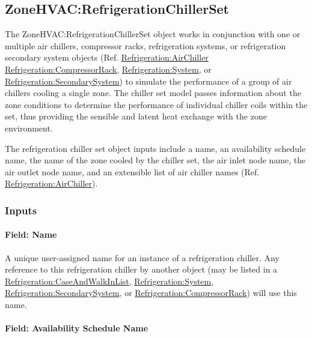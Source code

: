 \subsection{ZoneHVAC:RefrigerationChillerSet}\label{zonehvacrefrigerationchillerset}

The ZoneHVAC:RefrigerationChillerSet object works in conjunction with one or multiple air chillers, compressor racks, refrigeration systems, or refrigeration secondary system objects (Ref. \hyperref[refrigerationairchiller]{Refrigeration:AirChiller} \hyperref[refrigerationcompressorrack]{Refrigeration:CompressorRack}, \hyperref[refrigerationsystem]{Refrigeration:System}, or \hyperref[refrigerationsecondarysystem]{Refrigeration:SecondarySystem}) to simulate the performance of a group of air chillers cooling a single zone. The chiller set model passes information about the zone conditions to determine the performance of individual chiller coils within the set, thus providing the sensible and latent heat exchange with the zone environment.

The refrigeration chiller set object inputs include a name, an availability schedule name, the name of the zone cooled by the chiller set, the air inlet node name, the air outlet node name, and an extensible list of air chiller names (Ref. \hyperref[refrigerationairchiller]{Refrigeration:AirChiller}).

\subsubsection{Inputs}\label{inputs-10-024}

\paragraph{Field: Name}\label{field-name-10-020}

A unique user-assigned name for an instance of a refrigeration chiller. Any reference to this refrigeration chiller by another object (may be listed in a \hyperref[refrigerationcaseandwalkinlist]{Refrigeration:CaseAndWalkInList}, \hyperref[refrigerationsystem]{Refrigeration:System}, \hyperref[refrigerationsecondarysystem]{Refrigeration:SecondarySystem}, or \hyperref[refrigerationcompressorrack]{Refrigeration:CompressorRack}) will use this name.

\paragraph{Field: Availability Schedule Name}\label{field-availability-schedule-name-9-002}

